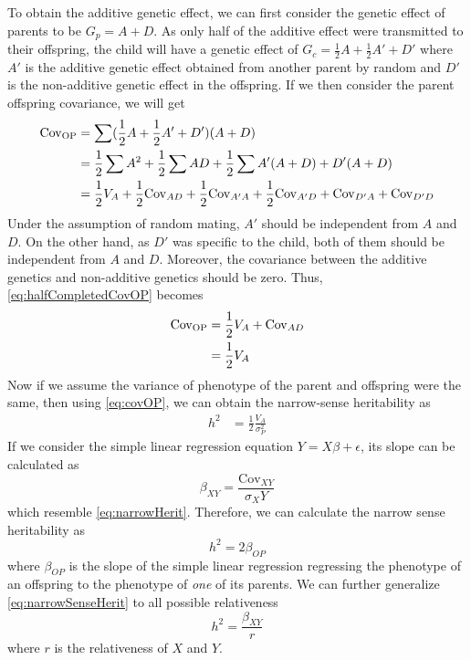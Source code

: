\documentclass[12pt]{book}
\begin{document}
	To obtain the additive genetic effect, we can first consider the genetic effect of parents to be $G_p=A+D$. 
	As only half of the additive effect were transmitted to their offspring, the child will have a genetic effect of $G_c=\frac{1}{2}A+\frac{1}{2}A'+D'$ where $A'$ is the additive genetic effect obtained from another parent by random and $D'$ is the non-additive genetic effect in the offspring.
	If we then consider the parent offspring covariance, we will get
	\begin{align}
	\mathrm{Cov_{OP}}&= \sum(\frac{1}{2}A+\frac{1}{2}A'+D')(A+D)\notag\\
	&=\frac{1}{2}\sum A^2+\frac{1}{2}\sum AD + \frac{1}{2}\sum A'(A+D) +D'(A+D) \notag\\ 
	&=\frac{1}{2}V_A+ \frac{1}{2}\mathrm{Cov}_{AD} + \frac{1}{2}\mathrm{Cov}_{A'A} + \frac{1}{2}\mathrm{Cov}_{A'D} +\mathrm{Cov}_{D'A} +\mathrm{Cov}_{D'D}  
	\label{eq:halfCompletedCovOP}
	\end{align} 
	Under the assumption of random mating,  $A'$ should be independent from $A$ and $D$. 
	On the other hand, as $D'$ was specific to the child, both of them should be independent from $A$ and $D$.
	Moreover, the covariance between the additive genetics and non-additive genetics should be zero\citep{Falconer1996}.
	Thus, \cref{eq:halfCompletedCovOP} becomes
	\begin{align}
	\mathrm{Cov_{OP}} &= \frac{1}{2}V_A+\mathrm{Cov}_{AD} \notag\\
	&= \frac{1}{2}V_A
	\label{eq:covOP}
	\end{align}
	Now if we assume the variance of phenotype of the parent and offspring were the same, then using \cref{eq:covOP}, we can obtain the narrow-sense heritability as
	\begin{align}
	h^2 &= \frac{1}{2}\frac{V_A}{\sigma_P^2}
	\label{eq:narrowHerit}
	\end{align}
	If we consider the simple linear regression equation $Y=X\beta+\epsilon$, its slope can be calculated as 
	\begin{equation}
	\beta_{XY} = \frac{\mathrm{Cov}_{XY}}{\sigma_{X}{Y}}
	\end{equation}
	which resemble \cref{eq:narrowHerit}. 
	Therefore,  we can calculate the narrow sense heritability as
	\begin{equation}
	h^2 = 2\beta_{OP}
	\label{eq:narrowSenseHerit}
	\end{equation}
	where $\beta_{OP}$ is the slope of the simple linear regression regressing the phenotype of an offspring to the phenotype of \emph{one} of its parents.
	We can further generalize \cref{eq:narrowSenseHerit} to all possible relativeness 
	\begin{equation}
	h^2=\frac{\beta_{XY}}{r}
	\label{eq:finalNarrow}
	\end{equation}
	where $r$ is the relativeness of $X$ and $Y$.
	
\end{document}
